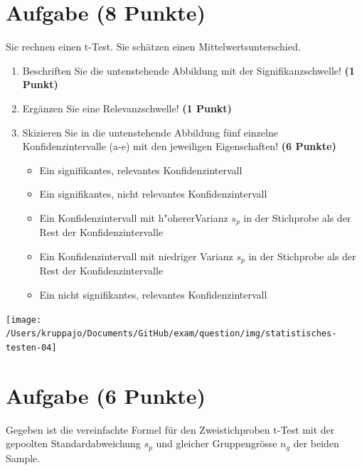 \documentclass[a4paper, 10pt]{scrartcl}\usepackage[]{graphicx}\usepackage[]{xcolor}
\begin{document}
 
\clearpage

\section{Aufgabe \hfill (8 Punkte)}



Sie rechnen einen t-Test. Sie sch{\"a}tzen einen Mittelwertsunterschied. 

\begin{enumerate}
\item Beschriften Sie die untenstehende Abbildung mit der
  Signifikanzschwelle! \textbf{(1 Punkt)}
\item Erg{\"a}nzen Sie eine Relevanzschwelle! \textbf{(1 Punkt)} 
\item Skizieren Sie in die
  untenstehende Abbildung f{\"u}nf einzelne Konfidenzintervalle (a-e) mit den
  jeweiligen Eigenschaften! \textbf{(6 Punkte)}
  \begin{itemize}
  \item[(a)] Ein signifikantes, relevantes Konfidenzintervall 	
  \item[(b)] Ein signifikantes, nicht relevantes Konfidenzintervall 	
  \item[(c)] Ein Konfidenzintervall mit h{"o}hererVarianz $s_p$ in der Stichprobe als der Rest der Konfidenzintervalle 	
  \item[(d)] Ein Konfidenzintervall mit niedriger Varianz $s_p$ in der Stichprobe als der Rest der Konfidenzintervalle 
  \item[(e)] Ein nicht signifikantes, relevantes Konfidenzintervall
  \end{itemize}
\end{enumerate}

\begin{center}
  \texttt{[image: /Users/kruppajo/Documents/GitHub/exam/question/img/statistisches-testen-04]}
\end{center}


 
\clearpage

\section{Aufgabe \hfill (6 Punkte)}

Gegeben ist die vereinfachte Formel f{\"u}r den Zweistichproben t-Test mit der
gepoolten Standardabweichung $s_p$ und gleicher Gruppengr{\"o}sse $n_g$ der
beiden Sample.
\end{document}
